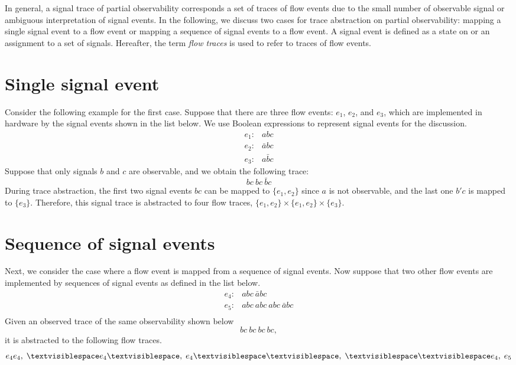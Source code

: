 \documentclass[12pt,frontmatter,copyright,thesis]{usfmanus}
\begin{document}
In general, a signal trace of partial observability
corresponds a set of traces of flow events due to the small number of
 observable signal or ambiguous interpretation of signal events. 
In the following, we discuss two cases for trace abstraction on
partial observability: mapping a single signal event to a
flow event or mapping a sequence of signal events to a flow
event.  A signal event is defined as a state on or an
assignment to a set of signals.
Hereafter, the term {\em flow traces} is used to refer to
traces of flow events.  
\section{Single signal event}
Consider the following example for
the first case.  Suppose that there are three flow events:
$e_1$, $e_2$, and $e_3$, which are implemented in hardware
by the signal events shown in the list below.  We use
Boolean expressions to represent signal events for the
discussion.
\[
\begin{array}{cl}
e_1: & abc\\
e_2: & \bar{a}bc\\
e_3: & a\bar{b}c
\end{array}
\] 
Suppose that only signals $b$ and $c$ are observable, and we
obtain the following trace:
\[
bc\ bc \ \bar{b}c
\]
During trace abstraction, the first two signal events $bc$
can be mapped to $\{e_1, e_2\}$ since $a$ is not observable,
and the last one $b'c$ is mapped to $\{e_3\}$.  Therefore,
this signal trace is abstracted to four flow traces, $\{e_1,
e_2\} \times \{e_1, e_2\} \times \{e_3\}$.
\section{Sequence of signal events}
Next, we consider the case where a flow event is mapped from
a sequence of signal events.  Now suppose that two other
flow events are implemented by sequences of signal events as
defined in the list below.
\[
\begin{array}{cl}
e_4: & abc\ \bar{a}bc\\
e_5: & abc\ abc\ abc\ \bar{a}bc\\
\end{array}
\] 
Given an observed trace of the same observability shown below
\[
bc\ bc\ bc \ bc,
\]
it is abstracted to the following flow traces.
\[
e_4e_4,\; \textvisiblespace e_4 \textvisiblespace,\;  e_4 \textvisiblespace \textvisiblespace,\;  \textvisiblespace \textvisiblespace e_4, \; e_5
\] 
\end{document}
